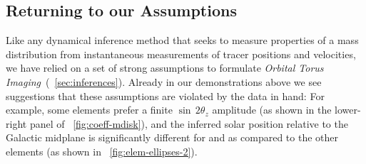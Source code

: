 \documentclass[modern]{aastex63}
\newcommand{\methodname}{\textsl{Orbital Torus Imaging}}
\begin{document}


\subsection{Returning to our Assumptions}

Like any dynamical inference method that seeks to measure properties of a mass
distribution from instantaneous measurements of tracer positions and velocities,
we have relied on a set of strong assumptions to formulate \methodname\
(\sectionname~\ref{sec:inferences}).
Already in our demonstrations above we see suggestions that these assumptions
are violated by the data in hand: For example, some elements prefer a finite
$\sin\,2\theta_z$ amplitude (as shown in the lower-right panel of
\figurename~\ref{fig:coeff-mdisk}), and the inferred solar position relative to
the Galactic midplane is significantly different for \abunratio{Mg}{Fe} and
\abunratio{Si}{Fe} as compared to the other elements (as shown in
\figurename~\ref{fig:elem-ellipses-2}).
\end{document}
